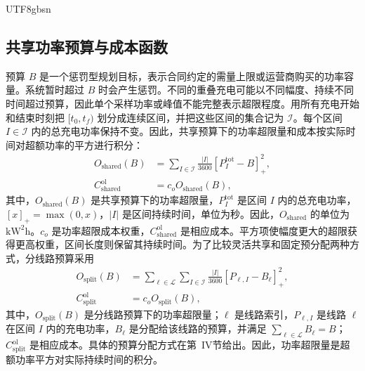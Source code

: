 \documentclass[conference]{IEEEtran}
\begin{document}
\begin{CJK*}{UTF8}{gbsn}
\subsection{共享功率预算与成本函数}
预算 $B$ 是一个惩罚型规划目标，表示合同约定的需量上限或运营商购买的功率容量。系统暂时超过 $B$ 时会产生惩罚。不同的重叠充电可能以不同幅度、持续不同时间超过预算，因此单个采样功率或峰值不能完整表示超限程度。用所有充电开始和结束时刻把 $[t_0,t_f)$ 划分成连续区间，并把这些区间的集合记为 $\mathcal{I}$。每个区间 $I\in\mathcal{I}$ 内的总充电功率保持不变。因此，共享预算下的功率超限量和成本按实际时间对超额功率的平方进行积分：
\begin{align}
 O_{\mathrm{shared}}(B)&=\sum_{I\in\mathcal{I}}\frac{|I|}{3600}
 [P^{\mathrm{tot}}_I-B]_+^2,\\
 C^{\mathrm{ol}}_{\mathrm{shared}}&=c_oO_{\mathrm{shared}}(B),
\end{align}
其中，$O_{\mathrm{shared}}(B)$ 是共享预算下的功率超限量，$P^{\mathrm{tot}}_I$ 是区间 $I$ 内的总充电功率，$[x]_+=\max(0,x)$，$|I|$ 是区间持续时间，单位为秒。因此，$O_{\mathrm{shared}}$ 的单位为 $\mathrm{kW}^2\mathrm{h}$。$c_o$ 是功率超限成本权重，$C^{\mathrm{ol}}_{\mathrm{shared}}$ 是相应成本。平方项使幅度更大的超限获得更高权重，区间长度则保留其持续时间。为了比较灵活共享和固定预分配两种方式，分线路预算采用
\begin{align}
 O_{\mathrm{split}}(B)&=\sum_{\ell\in\mathcal{L}}\sum_{I\in\mathcal{I}}
 \frac{|I|}{3600}[P_{\ell,I}-B_\ell]_+^2,\\
 C^{\mathrm{ol}}_{\mathrm{split}}&=c_oO_{\mathrm{split}}(B),
\end{align}
其中，$O_{\mathrm{split}}(B)$ 是分线路预算下的功率超限量；$\ell$ 是线路索引，$P_{\ell,I}$ 是线路 $\ell$ 在区间 $I$ 内的充电功率，$B_\ell$ 是分配给该线路的预算，并满足 $\sum_{\ell\in\mathcal{L}}B_\ell=B$；$C^{\mathrm{ol}}_{\mathrm{split}}$ 是相应成本。具体的预算分配方式在第~IV节给出。因此，功率超限量是超额功率平方对实际持续时间的积分。


\end{CJK*}
\end{document}
